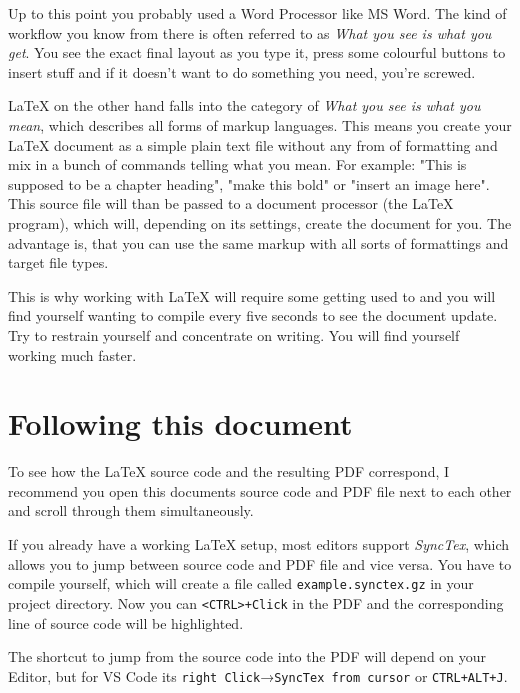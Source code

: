 \documentclass[
        faculty=1,
        paper=a4,
        fontsize=11pt,
        fontfamily=sans-serif,
        language=english,
        parskip=half+,
        linespacing=single,
        twoside=true,
        todos=off,
        draft=false,
    ]{HsH-report}
\begin{document}
    \medskip
    Up to this point you probably used a Word Processor like MS Word. The kind of workflow you know from there is often referred to as \emph{What you
    see is what you get}. You see the exact final layout as you type it, press some colourful buttons to insert stuff and if it doesn't want to do
    something you need, you're screwed.

    LaTeX on the other hand falls into the category of \emph{What you see is what you mean}, which describes all forms of markup languages. This means
    you create your LaTeX document as a simple plain text file without any from of formatting and mix in a bunch of commands telling what you mean.
    For example: "This is supposed to be a chapter heading", "make this bold" or "insert an image here". This source file will than be passed to a
    document processor (the LaTeX program), which will, depending on its settings, create the document for you. The advantage is, that you can use the
    same markup with all sorts of formattings and target file types.

    This is why working with LaTeX will require some getting used to and you will find yourself wanting to compile every five seconds to see the
    document update. Try to restrain yourself and concentrate on writing. You will find yourself working much faster.

    \section{Following this document}
        To see how the LaTeX source code and the resulting PDF correspond, I recommend you open this documents source code and PDF file next to each
        other and scroll through them simultaneously.

        If you already have a working LaTeX setup, most editors support \emph{SyncTex}, which allows you to jump between source code and PDF file and
        vice versa. You have to compile yourself, which will create a file called \verb|example.synctex.gz| in your project directory. Now you
        can \verb|<CTRL>+Click| in the PDF and the corresponding line of source code will be highlighted.

        The shortcut to jump from the source code into the PDF will depend on your Editor, but for VS Code its
        \verb|right Click|→\verb|SyncTex from cursor| or \verb|CTRL+ALT+J|.
\end{document}
